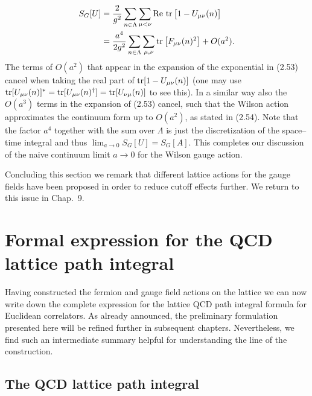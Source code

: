 \begin{equation}
  \begin{split}
    S_G[U] &= \frac{2}{g^2} \sum_{n\in\Lambda} \sum_{\mu<\nu}
      \operatorname{Re}\, \operatorname{tr}\big[1 - U_{\mu\nu}(n)\big] \\
    &= \frac{a^4}{2 g^2} \sum_{n\in\Lambda} \sum_{\mu,\nu}
      \operatorname{tr}\big[F_{\mu\nu}(n)^2\big] + O(a^2) .
  \end{split}
\end{equation}
The terms of $O(a^2)$ that appear in the expansion of the exponential in
(2.53) cancel when taking the real part of $\operatorname{tr}[1 - U_{\mu\nu}(n)]$ (one may
use $\operatorname{tr}[U_{\mu\nu}(n)]^* = \operatorname{tr}[U_{\mu\nu}(n)^\dagger] = \operatorname{tr}[U_{\nu\mu}(n)]$
to see this). In a similar way also the $O(a^3)$ terms in the expansion of
(2.53) cancel, such that the Wilson action approximates the continuum form
up to $O(a^2)$, as stated in (2.54). Note that the factor $a^4$ together
with the sum over $\Lambda$ is just the discretization of the space--time
integral and thus $\lim_{a\to 0} S_G[U] = S_G[A]$. This completes our
discussion of the naive continuum limit $a \to 0$ for the Wilson gauge
action.

Concluding this section we remark that different lattice actions for the
gauge fields have been proposed in order to reduce cutoff effects further.
We return to this issue in Chap.~9.

\section{Formal expression for the QCD lattice path integral}

Having constructed the fermion and gauge field actions on the lattice we can
now write down the complete expression for the lattice QCD path integral
formula for Euclidean correlators. As already announced, the preliminary
formulation presented here will be refined further in subsequent chapters.
Nevertheless, we find such an intermediate summary helpful for understanding
the line of the construction.

\subsection{The QCD lattice path integral}


